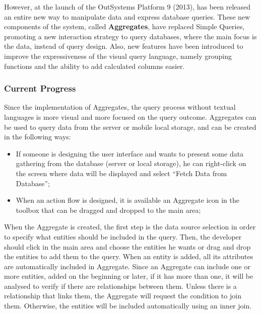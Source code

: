 However, at the launch of the OutSystems Platform 9 (2013), has been released an entire new way to manipulate data and express database queries. These new components of the system, called \textbf{Aggregates}, have replaced Simple Queries, promoting a new interaction strategy to query databases, where the main focus is the data, instead of query design. Also, new features have been introduced to improve the expressiveness of the visual query language, namely grouping functions and the ability to add calculated columns easier.


\subsubsection{Current Progress}
\label{subsubsec:current_progress}

Since the implementation of Aggregates, the query process without textual languages is more visual and more focused on the query outcome. Aggregates can be used to query data from the server or mobile local storage, and can be created in the following ways:

\begin{itemize}
	\item If someone is designing the user interface and wants to present some data gathering from the database (server or local storage), he can right-click on the screen where data will be displayed and select “Fetch Data from Database”;
	\item When an action flow is designed, it is available an Aggregate icon in the toolbox that can be dragged and dropped to the main area;
\end{itemize}

When the Aggregate is created, the first step is the data source selection in order to specify what entities should be included in the query. Then, the developer should click in the main area and choose the entities he wants or drag and drop the entities to add them to the query. When an entity is added, all its attributes are automatically included in Aggregate. Since an Aggregate can include one or more entities, added on the beginning or later, if it has more than one, it will be analysed to verify if there are relationships between them. Unless there is a relationship that links them, the Aggregate will request the condition to join them. Otherwise, the entities will be included automatically using an inner join.


